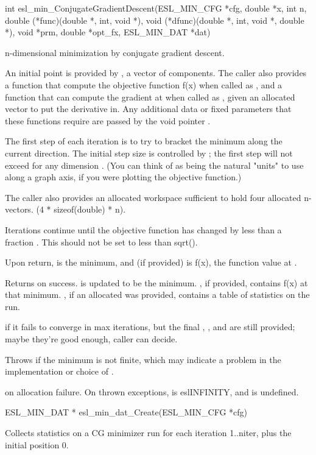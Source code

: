 \begin{sreapi}
\hypertarget{func:esl_min_ConjugateGradientDescent()}
{\item[int esl\_min\_ConjugateGradientDescent(ESL\_MIN\_CFG *cfg, double *x, int n, 
       				 double (*func)(double *, int, void *),
				 void (*dfunc)(double *, int, void *, double *),
				 void *prm, double *opt\_fx, ESL\_MIN\_DAT *dat)]}

n-dimensional minimization by conjugate gradient descent.

An initial point is provided by , a vector of 
components. The caller also provides a function  that 
compute the objective function f(x) when called as 
, and a function  that can
compute the gradient  at  when called as 
, given an allocated vector 
to put the derivative in. Any additional data or fixed
parameters that these functions require are passed by
the void pointer .

The first step of each iteration is to try to bracket
the minimum along the current direction. The initial step
size is controlled by ; the first step will not exceed 
 for any dimension . (You can think of  as
being the natural "units" to use along a graph axis, if
you were plotting the objective function.)

The caller also provides an allocated workspace sufficient to
hold four allocated n-vectors. (4 * sizeof(double) * n).

Iterations continue until the objective function has changed
by less than a fraction . This should not be set to less than
sqrt(). 

Upon return,  is the minimum, and  (if
provided) is f(x), the function value at .

Returns  on success.  is updated to be the minimum. ,
if provided, contains f(x) at that minimum. , if
an allocated  was provided, contains a table of 
statistics on the run.

 if it fails to converge in max iterations,
but the final , , and  are still provided;
maybe they're good enough, caller can decide.

Throws  if the minimum is not finite, which may
indicate a problem in the implementation or choice of .

 on allocation failure.
On thrown exceptions,  is eslINFINITY, and  is undefined.



\hypertarget{func:esl_min_dat_Create()}
{\item[ESL\_MIN\_DAT * esl\_min\_dat\_Create(ESL\_MIN\_CFG *cfg)]}

Collects statistics on a CG minimizer run for each
iteration 1..niter, plus the initial position 0.



\end{sreapi}


